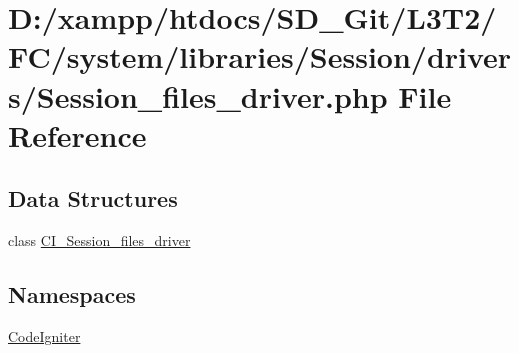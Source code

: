 \hypertarget{system_2libraries_2_session_2drivers_2_session__files__driver_8php}{}\section{D\+:/xampp/htdocs/\+S\+D\+\_\+\+Git/\+L3\+T2/\+F\+C/system/libraries/\+Session/drivers/\+Session\+\_\+files\+\_\+driver.php File Reference}
\label{system_2libraries_2_session_2drivers_2_session__files__driver_8php}
\subsection*{Data Structures}
\begin{DoxyCompactItemize}
\item 
class \hyperlink{class_c_i___session__files__driver}{C\+I\+\_\+\+Session\+\_\+files\+\_\+driver}
\end{DoxyCompactItemize}
\subsection*{Namespaces}
\begin{DoxyCompactItemize}
\item 
 \hyperlink{namespace_code_igniter}{Code\+Igniter}
\end{DoxyCompactItemize}
